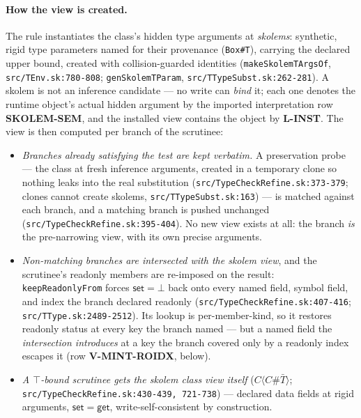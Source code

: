\documentclass[11pt]{article}
\begin{document}
\paragraph{How the view is created.} The rule instantiates the class's
hidden type arguments at \emph{skolems}: synthetic, rigid type
parameters named for their provenance (\texttt{Box\#T}), carrying the
declared upper bound, created with collision-guarded identities
(\texttt{makeSkolemTArgsOf}, \texttt{src/TEnv.sk:780-808};
\texttt{genSkolemTParam}, \texttt{src/TTypeSubst.sk:262-281}). A skolem
is not an inference candidate — no write can \emph{bind} it; each one
denotes the runtime object's actual hidden argument by the imported
interpretation row \textbf{SKOLEM-SEM}, and the installed view contains
the object by \textbf{L-INST}. The view is then computed per
branch of the scrutinee:
\begin{itemize}
\item \emph{Branches already satisfying the test are kept verbatim.} A
  preservation probe — the class at fresh inference arguments, created
  in a temporary clone so nothing leaks into the real substitution
  (\texttt{src/TypeCheckRefine.sk:373-379}; clones cannot create skolems,
  \texttt{src/TTypeSubst.sk:163}) — is matched against each branch, and
  a matching branch is pushed unchanged
  (\texttt{src/TypeCheckRefine.sk:395-404}). No new view exists at all:
  the branch \emph{is} the pre-narrowing view, with its own precise
  arguments.
\item \emph{Non-matching branches are intersected with the skolem
  view}, and the scrutinee's readonly members are re-imposed on the
  result: \texttt{keepReadonlyFrom} forces $\mathsf{set}=\bot$ back
  onto every named field, symbol field, and index the branch declared
  readonly (\texttt{src/TypeCheckRefine.sk:407-416};
  \texttt{src/TType.sk:2489-2512}). Its lookup is per-member-kind, so
  it restores readonly status at every key the branch named — but a named
  field the \emph{intersection introduces} at a key the branch covered
  only by a readonly index escapes it (row \textbf{V-MINT-ROIDX},
  below).
\item \emph{A $\top$-bound scrutinee gets the skolem class view
  itself} ($C\langle C\#\bar{T}\rangle$;
  \texttt{src/TypeCheckRefine.sk:430-439, 721-738}) — declared data
  fields at rigid arguments, $\mathsf{set}=\mathsf{get}$,
  write-self-consistent by construction.
\end{itemize}
\end{document}
